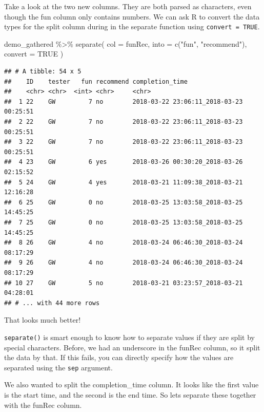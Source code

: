 \documentclass[
]{book}
\newenvironment{Shaded}{\begin{snugshade}}{\end{snugshade}}
\newcommand{\AttributeTok}[1]{\textcolor[rgb]{0.77,0.63,0.00}{#1}}
\newcommand{\ConstantTok}[1]{\textcolor[rgb]{0.00,0.00,0.00}{#1}}
\newcommand{\FunctionTok}[1]{\textcolor[rgb]{0.00,0.00,0.00}{#1}}
\newcommand{\NormalTok}[1]{#1}
\newcommand{\SpecialCharTok}[1]{\textcolor[rgb]{0.00,0.00,0.00}{#1}}
\newcommand{\StringTok}[1]{\textcolor[rgb]{0.31,0.60,0.02}{#1}}
\begin{document}
Take a look at the two new columns. They are both parsed as characters, even though the fun column only contains numbers. We can ask R to convert the data types for the split column during in the separate function using \texttt{convert\ =\ TRUE}.

\begin{Shaded}
\begin{Highlighting}[]
\NormalTok{demo\_gathered }\SpecialCharTok{\%\textgreater{}\%}
  \FunctionTok{separate}\NormalTok{(}
    \AttributeTok{col =}\NormalTok{ funRec,}
    \AttributeTok{into =} \FunctionTok{c}\NormalTok{(}\StringTok{"fun"}\NormalTok{, }\StringTok{"recommend"}\NormalTok{),}
    \AttributeTok{convert =} \ConstantTok{TRUE}
\NormalTok{    )}
\end{Highlighting}
\end{Shaded}

\begin{verbatim}
## # A tibble: 54 x 5
##    ID    tester   fun recommend completion_time                        
##    <chr> <chr>  <int> <chr>     <chr>                                  
##  1 22    GW         7 no        2018-03-22 23:06:11_2018-03-23 00:25:51
##  2 22    GW         7 no        2018-03-22 23:06:11_2018-03-23 00:25:51
##  3 22    GW         7 no        2018-03-22 23:06:11_2018-03-23 00:25:51
##  4 23    GW         6 yes       2018-03-26 00:30:20_2018-03-26 02:15:52
##  5 24    GW         4 yes       2018-03-21 11:09:38_2018-03-21 12:16:28
##  6 25    GW         0 no        2018-03-25 13:03:58_2018-03-25 14:45:25
##  7 25    GW         0 no        2018-03-25 13:03:58_2018-03-25 14:45:25
##  8 26    GW         4 no        2018-03-24 06:46:30_2018-03-24 08:17:29
##  9 26    GW         4 no        2018-03-24 06:46:30_2018-03-24 08:17:29
## 10 27    GW         5 no        2018-03-21 03:23:57_2018-03-21 04:28:01
## # ... with 44 more rows
\end{verbatim}

That looks much better!

\texttt{separate()} is smart enough to know how to separate values if they are split by special characters. Before, we had an underscore in the funRec column, so it split the data by that. If this fails, you can directly specify how the values are separated using the \texttt{sep} argument.

We also wanted to split the completion\_time column. It looks like the first value is the start time, and the second is the end time. So lets separate these together with the funRec column.
\end{document}
